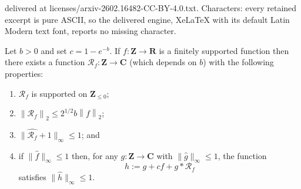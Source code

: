 \documentclass[10pt,a4paper]{amsart}
\newcommand{\bbc}{\mathbf{C}}
\newcommand{\bbr}{\mathbf{R}}
\newcommand{\bbz}{\mathbf{Z}}
\newcommand{\norm}[1]{\left\lVert #1\right\rVert}
\newcommand{\ri}{\mathcal{R}}
\renewcommand{\leq}{\leqslant}
\begin{document}
delivered at licenses/arxiv-2602.16482-CC-BY-4.0.txt. Characters: every retained excerpt is pure ASCII, so the delivered engine, XeLaTeX with its default Latin Modern text font, reports no missing character.
\begin{lemma}\label{lem-MPS}
Let $b>0$ and set $c=1-e^{-b}$. If $f:\bbz \to \bbr$ is a finitely supported function then there exists a function $\ri_f:\bbz\to \bbc$ \textup{(}which depends on $b$\textup{)} with the following properties:
\begin{enumerate}
\item $\ri_f$ is supported on $\bbz_{\leq 0}$;
\item $\norm{\ri_f}_2\leq 2^{1/2}b\norm{f}_2$;
\item $\|\widehat{\ri_f}+1\|_\infty\leq 1$; and 
\item if $\|\widehat{f}\|_\infty\leq 1$ then, for any $g:\bbz\to \bbc$ with $\| \widehat{g}\|_\infty\leq 1$, the function
\[h :=g+cf+g\ast \ri_f\]
satisfies $\| \widehat{h}\|_\infty \leq 1$.
\end{enumerate}
\end{lemma}
\end{document}
